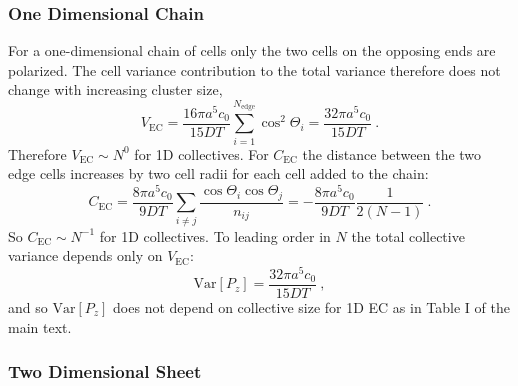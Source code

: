 \subsubsection{One Dimensional Chain}

For a one-dimensional chain of cells only the two cells on the opposing ends are polarized. The cell variance contribution to the total variance therefore does not change with increasing cluster size,
\begin{equation}
    V_\text{EC} = \frac{16\pi a^5c_0}{15DT} \sum_{i=1}^{N_\text{edge}} \cos^2\Theta_i = \frac{32\pi a^5c_0}{15DT} \ .
\end{equation}
Therefore $V_\text{EC} \sim N^0$ for 1D collectives. For $C_\text{EC}$ the distance between the two edge cells increases by two cell radii for each cell added to the chain:
\begin{equation}
    C_\text{EC} = \frac{8\pi a^5c_0}{9DT} \sum_{i\neq j} \frac{\cos\Theta_i \cos\Theta_j}{n_{ij}} = -\frac{8\pi a^5c_0}{9DT} \frac{1}{2(N-1)} \ .
\end{equation}
So $C_\text{EC} \sim N^{-1}$ for 1D collectives. To leading order in $N$ the total collective variance depends only on $V_\text{EC}$:
\begin{equation}
    \text{Var}[P_z] = \frac{32\pi a^5c_0}{15DT} \ ,
\end{equation}
and so $\text{Var}[P_z]$ does not depend on collective size for 1D EC as in Table I of the main text.

\subsubsection{Two Dimensional Sheet}

